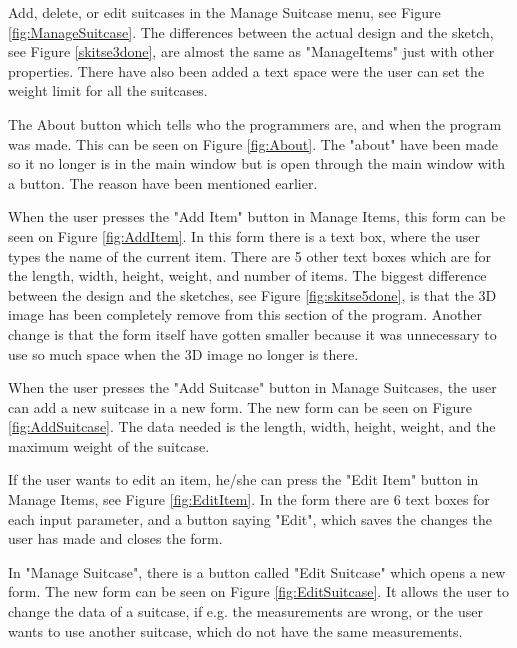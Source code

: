 Add, delete, or edit suitcases in the Manage Suitcase menu, see Figure \ref{fig:ManageSuitcase}. The differences between the actual design and the sketch, see Figure \ref{skitse3done}, are almost the same as "ManageItems" just with other properties. There have also been added a text space were the user can set the weight limit for all the suitcases.

The About button which tells who the programmers are, and when the program was made. This can be seen on Figure \ref{fig:About}. The "about" have been made so it no longer is in the main window but is open through the main window with a button. The reason have been mentioned earlier.

When the user presses the "Add Item" button in Manage Items, this form can be seen on Figure \ref{fig:AddItem}. In this form there is a text box, where the user types the name of the current item. There are 5 other text boxes which are for the length, width, height, weight, and number of items. The biggest difference between the design and the sketches, see Figure \ref{fig:skitse5done}, is that the 3D image has been completely remove from this section of the program. Another change is that the form itself have gotten smaller because it was unnecessary to use so much space when the 3D image no longer is there.

When the user presses the "Add Suitcase" button in Manage Suitcases, the user can add a new suitcase in a new form. The new form can be seen on Figure \ref{fig:AddSuitcase}. The data needed is the length, width, height, weight, and the maximum weight of the suitcase.

If the user wants to edit an item, he/she can press the "Edit Item" button in Manage Items, see Figure \ref{fig:EditItem}. In the form there are 6 text boxes for each input parameter, and a button saying "Edit", which saves the changes the user has made and closes the form.

In "Manage Suitcase", there is a button called "Edit Suitcase" which opens a new form. The new form can be seen on Figure \ref{fig:EditSuitcase}. It allows the user to change the data of a suitcase, if e.g. the measurements are wrong, or the user wants to use another suitcase, which do not have the same measurements.


